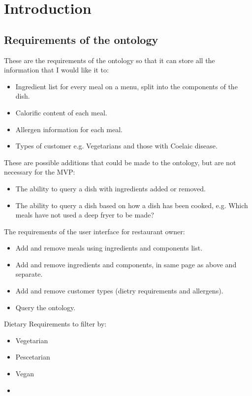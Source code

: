 \chapter{Introduction}

\section{Requirements of the ontology}

These are the requirements of the ontology so that it can store all the information that I would like it to:

\begin{itemize}
\item Ingredient list for every meal on a menu, split into the components of the dish.
\item Calorific content of each meal.
\item Allergen information for each meal.
\item Types of customer e.g. Vegetarians and those with Coelaic disease.
\end{itemize}

These are possible additions that could be made to the ontology, but are not necessary for the MVP:

\begin{itemize}
\item The ability to query a dish with ingredients added or removed.
\item The ability to query a dish based on how a dish has been cooked, e.g. Which meals have not used a deep fryer to be made?
\end{itemize}

The requirements of the user interface for restaurant owner:

\begin{itemize}
\item Add and remove meals using ingredients and components list.
\item Add and remove ingredients and components, in same page as above and separate.
\item Add and remove customer types (dietry requirements and allergens).
\item Query the ontology.
\end{itemize}

Dietary Requirements to filter by:

\begin{itemize}
\item Vegetarian
\item Pescetarian
\item Vegan
\item
\end{itemize}

